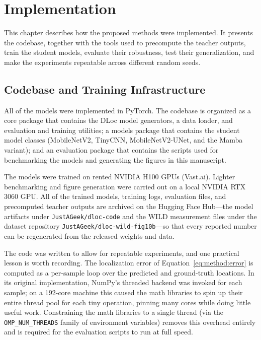 \chapter{Implementation}
\label{ch:implementation}

This chapter describes how the proposed methods were implemented. It presents the codebase, together with
the tools used to precompute the teacher outputs, train the student models, evaluate their robustness,
test their generalization, and make the experiments repeatable across different random seeds.

\section{Codebase and Training Infrastructure}
\label{sec:impl:infra}

All of the models were implemented in PyTorch. The codebase is organized as a core package that contains
the DLoc model generators, a data loader, and evaluation and training utilities; a models package that
contains the student model classes (MobileNetV2, TinyCNN, MobileNetV2-UNet, and the Mamba variant); and
an evaluation package that contains the scripts used for benchmarking the models and generating the
figures in this manuscript.

The models were trained on rented NVIDIA H100 GPUs (Vast.ai). Lighter benchmarking and figure generation
were carried out on a local NVIDIA RTX 3060 GPU. All of the trained models, training logs, evaluation
files, and precomputed teacher outputs are archived on the Hugging Face Hub---the model artifacts under
\texttt{JustAGeek/dloc-code} and the WILD measurement files under the dataset repository
\texttt{JustAGeek/dloc-wild-fig10b}---so that every reported number can be regenerated from the released
weights and data.

The code was written to allow for repeatable experiments, and one practical lesson is worth recording.
The localization error of Equation~\eqref{eq:method:error} is computed as a per-sample loop over the
predicted and ground-truth locations. In its original implementation, NumPy's threaded backend was
invoked for each sample; on a 192-core machine this caused the math libraries to spin up their entire
thread pool for each tiny operation, pinning many cores while doing little useful work. Constraining the
math libraries to a single thread (via the \texttt{OMP\_NUM\_THREADS} family of environment variables)
removes this overhead entirely and is required for the evaluation scripts to run at full speed.

